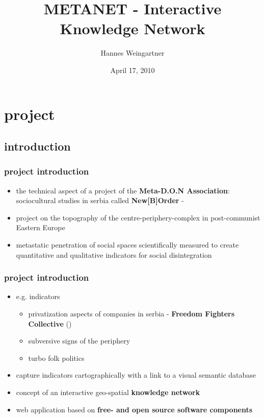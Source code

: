\documentclass[blue]{beamer}
\title{METANET - Interactive Knowledge Network}
\institute[META-D.O.N]{META-D.O.N\\Association for Cultural Substitution Services}
\author{Hannes Weingartner}
\date{April 17, 2010}
\begin{document}
\frame{\titlepage}

\setcounter{tocdepth}{1}
\frame{\tableofcontents}




\section{project}
\subsection{introduction}
\frame
{
\frametitle{\textbf{project introduction}}
\begin{itemize}
\item the technical aspect of a project of the \textbf{Meta-D.O.N Association}: sociocultural studies in serbia called \textbf{New[B]Order} - 
\item project on the topography of the centre-periphery-complex in post-communist Eastern Europe
\item metastatic penetration of social spaces scientifically measured to create quantitative and qualitative indicators for social disintegration
\end{itemize}
}

\frame
{
\frametitle{\textbf{project introduction}}
\begin{itemize}
	\item e.g. indicators
	\begin{itemize}
		\item privatization aspects of companies in serbia - \textbf{Freedom Fighters Collective} ()
		\item subversive signs of the periphery
		\item turbo folk politics
	\end{itemize}
	\item capture indicators cartographically with a link to a visual semantic database
	\item concept of an interactive geo-spatial \textbf{knowledge network}
	\item web application based on \textbf{free- and open source software components}
\end{itemize}
}
\end{document}
